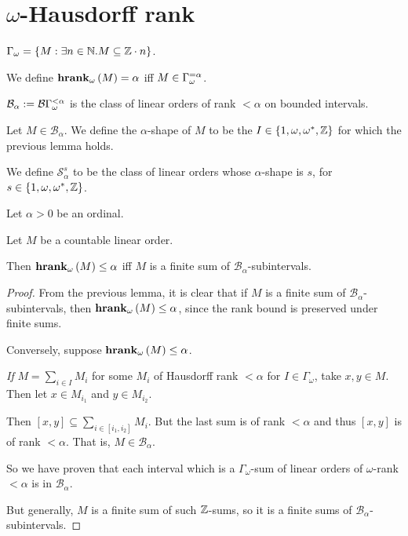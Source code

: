 

\section{$\omega$-Hausdorff rank}

\begin{definitions}
  $\Gamma_{\omega} = \left\{ {M : \exists n \in \mathbb{N} . M \subseteq \mathbb{Z} \cdot n} \right\}$.

  We define $\mathbf{hrank}_{\omega}\left( M \right) = \alpha$ iff $M \in \Gamma_{\omega}^{= \alpha}$.

  $\mathcal{B}_{\alpha} := \mathcal{B}{\Gamma_{\omega}^{< \alpha}}$ is the class
  of linear orders of rank $< \alpha$ on bounded intervals.
\end{definitions}


\begin{definition}
  Let $M \in \mathcal{B}_{\alpha}$. We define the $\alpha$-shape
  of $M$ to be the $I \in \left\{ {1, \omega, \omega^\ast, \mathbb{Z}} \right\}$ 
  for which the previous lemma holds.

  We define $\mathcal{S}^{s}_{\alpha}$ to be the class of linear orders
  whose $\alpha$-shape is $s$, for $s \in \left\{ {1, \omega, \omega^\ast, \mathbb{Z}} \right\}$.
\end{definition}

\begin{lemma}
  Let $\alpha > 0$ be an ordinal.

  Let $M$ be a countable linear order.

  Then $\mathbf{hrank}_{\omega}\left( M \right) \le \alpha$ iff $M$ is a finite sum of $\mathcal{B}_{\alpha}$-subintervals.
\end{lemma}

\begin{proof}
  From the previous lemma, it is clear that if $M$ is a finite sum of $\mathcal{B}_{\alpha}$-subintervals,
  then $\mathbf{hrank}_{\omega}\left( M \right) \le \alpha$, since the rank bound is preserved under finite sums.

  Conversely, suppose $\mathbf{hrank}_{\omega}\left( M \right) \le \alpha$.

  \emph{If} $M = \sum_{i \in I} M_i$ for some $M_i$ of Hausdorff rank $< \alpha$ for $I \in \Gamma_{\omega}$,
  take $x, y \in M$. Then let $x \in M_{i_1}$ and $y \in M_{i_2}$.

  Then $[x, y] \subseteq \sum_{i \in [i_1, i_2]} M_i$. But the last sum is of rank $< \alpha$
  and thus $[x, y]$ is of rank $< \alpha$. That is, $M \in \mathcal{B}_{\alpha}$.

  So we have proven that each interval which is a $\Gamma_{\omega}$-sum of linear orders of
  $\omega$-rank $< \alpha$ is in $\mathcal{B}_{\alpha}$.

  But generally, $M$ is a finite sum of such $\mathbb{Z}$-sums, so it is a finite sums
  of $\mathcal{B}_{\alpha}$-subintervals.
\end{proof}

